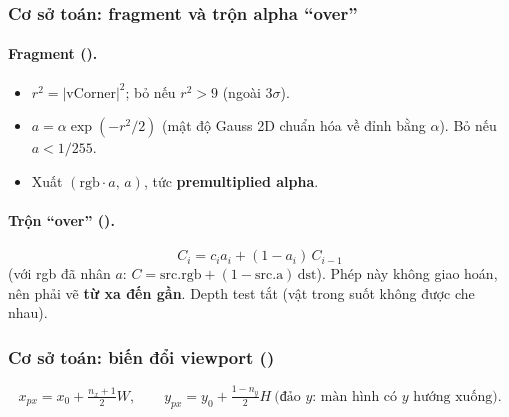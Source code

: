 \subsubsection{Cơ sở toán: fragment và trộn alpha ``over''}\label{s:blend-frag}
\paragraph{Fragment ().}
\begin{itemize}
\item $r^2=|\mathrm{vCorner}|^2$; bỏ nếu $r^2>9$ (ngoài $3\sigma$).
\item $a=\alpha\exp(-r^2/2)$ (mật độ Gauss 2D chuẩn hóa về đỉnh bằng $\alpha$). Bỏ nếu $a<1/255$.
\item Xuất $(\mathrm{rgb}\cdot a,\,a)$, tức \textbf{premultiplied alpha}.
\end{itemize}

\paragraph{Trộn ``over'' ().}
\[
C_i = c_i a_i + (1-a_i)\,C_{i-1}
\]
(với rgb đã nhân $a$: $C=\mathrm{src.rgb}+(1-\mathrm{src.a})\,\mathrm{dst}$). Phép này không giao hoán, nên phải vẽ \textbf{từ xa đến gần}. Depth test tắt (vật trong suốt không được che nhau).

\subsubsection{Cơ sở toán: biến đổi viewport (\texorpdfstring{}{brush._to_screen})}\label{s:viewport}
\[
x_{px}=x_0+\tfrac{n_x+1}{2}W,\qquad y_{px}=y_0+\tfrac{1-n_y}{2}H\ \text{(đảo $y$: màn hình có $y$ hướng xuống)}.
\]

